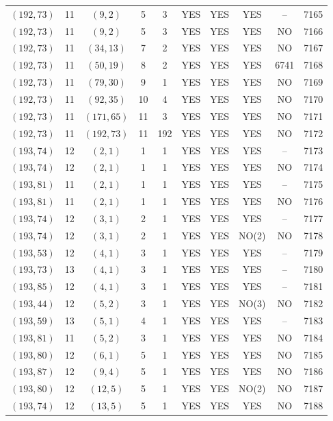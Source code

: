 \begin{longtable}{|c|c|c|c|c|c|c|c|c|c|}
$(192, 73)$ & 11 & $(9, 2)$ & 5 & 3 & YES & YES & YES & -- & 7165\\
$(192, 73)$ & 11 & $(9, 2)$ & 5 & 3 & YES & YES & YES & NO & 7166\\
$(192, 73)$ & 11 & $(34, 13)$ & 7 & 2 & YES & YES & YES & NO & 7167\\
$(192, 73)$ & 11 & $(50, 19)$ & 8 & 2 & YES & YES & YES & 6741 & 7168\\
$(192, 73)$ & 11 & $(79, 30)$ & 9 & 1 & YES & YES & YES & NO & 7169\\
$(192, 73)$ & 11 & $(92, 35)$ & 10 & 4 & YES & YES & YES & NO & 7170\\
$(192, 73)$ & 11 & $(171, 65)$ & 11 & 3 & YES & YES & YES & NO & 7171\\
$(192, 73)$ & 11 & $(192, 73)$ & 11 & 192 & YES & YES & YES & NO & 7172\\
$(193, 74)$ & 12 & $(2, 1)$ & 1 & 1 & YES & YES & YES & -- & 7173\\
$(193, 74)$ & 12 & $(2, 1)$ & 1 & 1 & YES & YES & YES & NO & 7174\\
$(193, 81)$ & 11 & $(2, 1)$ & 1 & 1 & YES & YES & YES & -- & 7175\\
$(193, 81)$ & 11 & $(2, 1)$ & 1 & 1 & YES & YES & YES & NO & 7176\\
$(193, 74)$ & 12 & $(3, 1)$ & 2 & 1 & YES & YES & YES & -- & 7177\\
$(193, 74)$ & 12 & $(3, 1)$ & 2 & 1 & YES & YES & NO(2) & NO & 7178\\
$(193, 53)$ & 12 & $(4, 1)$ & 3 & 1 & YES & YES & YES & -- & 7179\\
$(193, 73)$ & 13 & $(4, 1)$ & 3 & 1 & YES & YES & YES & -- & 7180\\
$(193, 85)$ & 12 & $(4, 1)$ & 3 & 1 & YES & YES & YES & -- & 7181\\
$(193, 44)$ & 12 & $(5, 2)$ & 3 & 1 & YES & YES & NO(3) & NO & 7182\\
$(193, 59)$ & 13 & $(5, 1)$ & 4 & 1 & YES & YES & YES & -- & 7183\\
$(193, 81)$ & 11 & $(5, 2)$ & 3 & 1 & YES & YES & YES & NO & 7184\\
$(193, 80)$ & 12 & $(6, 1)$ & 5 & 1 & YES & YES & YES & NO & 7185\\
$(193, 87)$ & 12 & $(9, 4)$ & 5 & 1 & YES & YES & YES & NO & 7186\\
$(193, 80)$ & 12 & $(12, 5)$ & 5 & 1 & YES & YES & NO(2) & NO & 7187\\
$(193, 74)$ & 12 & $(13, 5)$ & 5 & 1 & YES & YES & YES & NO & 7188\\

\end{longtable}
